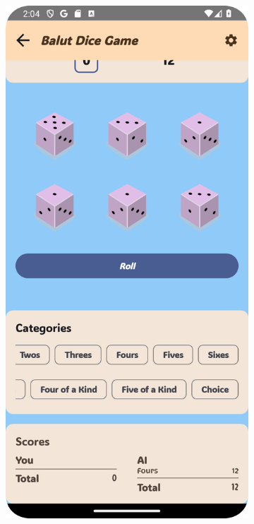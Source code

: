 \begin{figure}[h]
    \centering
    \begin{subfigure}[b]{0.27\textwidth}
        \includegraphics[width=\textwidth]{img/balut board.png}

\end{subfigure}
\end{figure}
